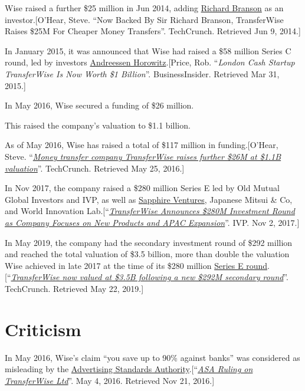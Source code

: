 \documentclass{book}
\numberwithin{equation}{section}
\begin{document}
%
Wise raised a further \$25 million in Jun 2014, adding \href{https://en.wikipedia.org/wiki/Richard_Branson}{Richard Branson} as an investor.[O'Hear, Steve. ``Now Backed By Sir Richard Branson, TransferWise Raises \$25M For Cheaper Money Transfers''. TechCrunch. Retrieved Jun 9, 2014.]

%
In January 2015, it was announced that Wise had raised a \$58 million Series C round, led by investors \href{https://en.wikipedia.org/wiki/Andreessen_Horowitz}{Andreessen Horowitz}.[Price, Rob. ``\textit{London Cash Startup TransferWise Is Now Worth \$1 Billion}''. BusinessInsider. Retrieved Mar 31, 2015.]

%
In May 2016, Wise secured a funding of \$26 million.

This raised the company's valuation to \$1.1 billion.

As of May 2016, Wise has raised a total of \$117 million in funding.[O'Hear, Steve. ``\href{https://techcrunch.com/2016/05/25/money-transfer-company-transferwise-raises-further-26m-at-1-1b-valuation/}{\textit{Money transfer company TransferWise raises further \$26M at \$1.1B valuation}}''. TechCrunch. Retrieved May 25, 2016.]

%
In Nov 2017, the company raised a \$280 million Series E led by Old Mutual Global Investors and IVP, as well as \href{https://en.wikipedia.org/wiki/Sapphire_Ventures}{Sapphire Ventures}, Japanese Mitsui \& Co, and World Innovation Lab.[``\href{https://www.ivp.com/news/press-release/transferwise-announces-280m-investment-round-as-company-focuses-on-new-products-and-apac-expansion/}{\textit{TransferWise Announces \$280M Investment Round as Company Focuses on New Products and APAC Expansion}}''. IVP. Nov 2, 2017.]

%
In May 2019, the company had the secondary investment round of \$292 million and reached the total valuation of \$3.5 billion, more than double the valuation Wise achieved in late 2017 at the time of its \$280 million \href{https://en.wikipedia.org/wiki/Venture_round}{Series E round}.[``\href{http://social.techcrunch.com/2019/05/21/three-point-five-unicorns/}{\textit{TransferWise now valued at \$3.5B following a new \$292M secondary round}}''. TechCrunch. Retrieved May 22, 2019.]

\section{Criticism}
In May 2016, Wise's claim ``you save up to 90\% against banks'' was considered as misleading by the \href{https://en.wikipedia.org/wiki/Advertising_Standards_Authority_(United_Kingdom)}{Advertising Standards Authority}.[``\href{https://www.asa.org.uk/rulings/transferwise-ltd-a15-312197.html}{\textit{ASA Ruling on TransferWise Ltd}}''. May 4, 2016. Retrieved Nov 21, 2016.]
\end{document}
